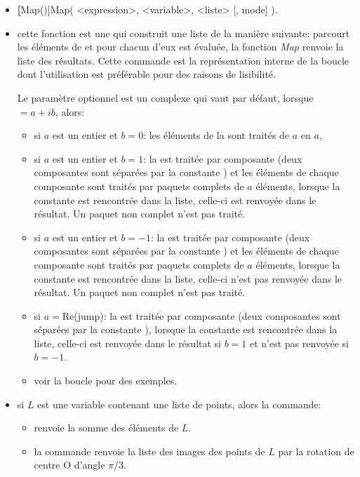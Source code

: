 \begin{itemize}
 \item \util \textbf[Map()]{Map( <expression>, <variable>, <liste> [, mode] )}.
 \item \desc cette fonction est une  qui construit une liste de la manière suivante:  parcourt les éléments de  et pour chacun d'eux  est évaluée, la fonction \textsl{Map} renvoie la liste des résultats. Cette commande est la représentation interne de la boucle  dont l'utilisation est préférable pour des raisons de lisibilité.

 Le paramètre optionnel  est un complexe qui vaut \Nil par défaut, lorsque $=a+ib$, alors:
  \begin{itemize}
  \item si $a$ est un entier et $b=0$: les éléments de la  sont traités de $a$ en $a$,
  \item si $a$ est un entier et $b=1$: la  est traitée par composante (deux composantes sont séparées par la constante \jump) et les éléments de chaque composante sont traités par paquets complets de $a$ éléments, lorsque la constante \jump est rencontrée dans la liste, celle-ci est renvoyée dans le résultat. Un paquet non complet n'est pas traité.
  \item si $a$ est un entier et $b=-1$: la  est traitée par composante (deux composantes sont séparées par la constante \jump) et les éléments de chaque composante sont traités par paquets complets de $a$ éléments, lorsque la constante \jump est rencontrée dans la liste, celle-ci n'est pas renvoyée dans le résultat. Un paquet non complet n'est pas traité.
  \item si $a=$Re(jump): la  est traitée par composante (deux composantes sont séparées par la constante \jump), lorsque la constante \jump est rencontrée dans la liste, celle-ci est renvoyée dans le résultat si $b=1$ et n'est pas renvoyée si $b=-1$.
  \item \exem voir la boucle  pour des exemples.
  \end{itemize}

 \item \exem si $L$ est une variable contenant une liste de points, alors la commande:
  \begin{itemize}
  \item \co{[sum:=0, Map( Inc(sum,z), z, L), sum]} renvoie la somme des éléments de $L$.
  \item la commande  renvoie la liste des images des points de $L$ par la rotation de centre O d'angle $\pi$/3.
  \end{itemize}
\end{itemize}

